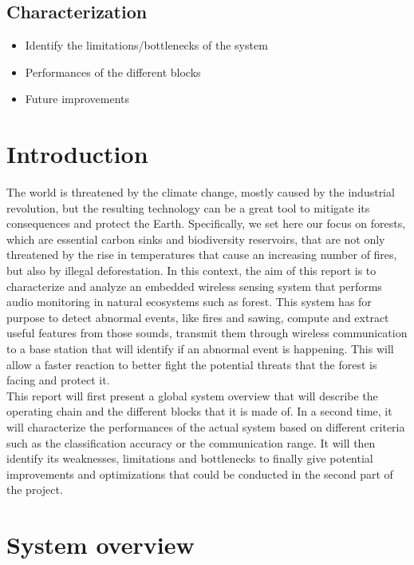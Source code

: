 \documentclass{article}
\begin{document}
\subsection{Characterization}
\begin{itemize}
    \item Identify the limitations/bottlenecks of the system
    \item Performances of the different blocks
    \item Future improvements
\end{itemize}


\section{Introduction}

The world is threatened by the climate change, mostly caused by the industrial revolution, but the resulting technology can be a great tool to mitigate its consequences and protect the Earth. Specifically, we set here our focus on forests, which are essential carbon sinks and biodiversity reservoirs, that are not only threatened by the rise in temperatures that cause an increasing number of fires, but also by illegal deforestation. In this context, the aim of this report is to characterize and analyze an embedded wireless sensing system that performs audio monitoring in natural ecosystems such as forest. This system has for purpose to detect abnormal events, like fires and sawing, compute and extract useful features from those sounds, transmit them through wireless communication to a base station that will identify if an abnormal event is happening. This will allow a faster reaction to better fight the potential threats that the forest is facing and protect it. \\

This report will first present a global system overview that will describe the operating chain and the different blocks that it is made of. In a second time, it will characterize the performances of the actual system based on different criteria such as the classification accuracy or the communication range. It will then identify its weaknesses, limitations and bottlenecks to finally give potential improvements and optimizations that could be conducted in the second part of the project.

\section{System overview}
\end{document}
